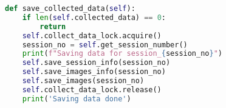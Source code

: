 \begin{lstlisting}[language=Python, caption=Sauvegarde des données]
def save_collected_data(self):
    if len(self.collected_data) == 0:
        return
    self.collect_data_lock.acquire()
    session_no = self.get_session_number()
    print(f"Saving data for session_{session_no}")
    self.save_session_info(session_no)
    self.save_images_info(session_no)
    self.save_images(session_no)
    self.collect_data_lock.release()
    print('Saving data done')
\end{lstlisting}

